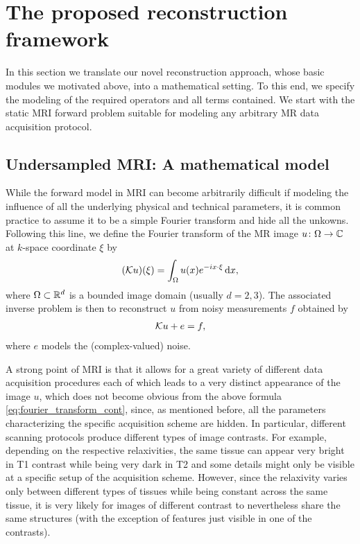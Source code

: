 \section{The proposed reconstruction framework}
\label{sec:modeling}
In this section we translate our novel reconstruction approach, whose basic modules we motivated above, into a mathematical setting. 
To this end, we specify the modeling of the required operators and all terms contained.
We start with the static MRI forward problem suitable for modeling any arbitrary MR data acquisition protocol. 

\subsection{Undersampled MRI: A mathematical model}
\label{subsec:operator modeling}

While the forward model in MRI can become arbitrarily difficult if modeling the influence of all the underlying physical and technical parameters, it is common practice to assume it to be a simple Fourier transform and hide all the unkowns.
Following this line, we define the Fourier transform of the MR image $u \colon \Omega \to \mathbb{C}$ at $k$-space coordinate $\xi$ by 
\begin{align}\label{eq:fourier_transform_cont}
	(\mathcal{K} u)(\xi) = \int_\Omega u(x) e^{-i x \cdot \xi} \,\mathrm{d}x, 
\end{align}
where $\Omega \subset \mathbb{R}^d$ is a bounded image domain (usually $d=2,3$).
The associated inverse problem is then to reconstruct $u$ from noisy measurements $f$ obtained by 
\begin{align}\label{eq:inverse_problem}
	\mathcal{K} u + e = f, 
\end{align}
where $e$ models the (complex-valued) noise. 

A strong point of MRI is that it allows for a great variety of different data acquisition procedures each of which leads to a very distinct appearance of the image $u$, which does not become obvious from the above formula \eqref{eq:fourier_transform_cont}, since, as mentioned before, all the parameters characterizing the specific acquisition scheme are hidden.   
In particular, different scanning protocols produce different types of image contrasts.
For example, depending on the respective relaxivities, the same tissue can appear very bright in T1 contrast while being very dark in T2 and some details might only be visible at a specific setup of the acquisition scheme.    
However, since the relaxivity varies only between different types of tissues while being constant across the same tissue, it is very likely for images of different contrast to nevertheless share the same structures (with the exception of features just visible in one of the contrasts).

